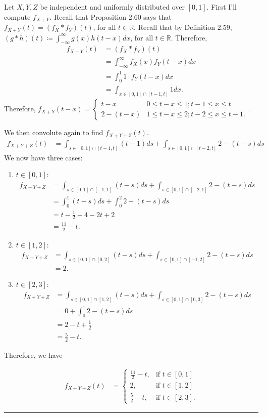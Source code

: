 \documentclass{article}
\theoremstyle{break}
\newenvironment{solution}{{\bf Solution:}}{\hfill\rule{2mm}{2mm}}
\newcommand{\R}{\mathbb{R}}
\begin{document}
\begin{solution}
Let $X,Y,Z$ be independent and uniformly distributed over $[0,1]$. First I'll compute $f_{X+Y}$. Recall that Proposition 2.60 says that $f_{X+Y}(t) = (f_X \ast f_Y)(t)$, for all $t \in \R$. Recall that by Definition 2.59, $(g \ast h)(t) \coloneqq \int_{-\infty}^\infty g(x) h(t-x) dx$, for all $t \in \R$. Therefore,
\begin{align*}
f_{X+Y}(t) &= (f_X \ast f_Y)(t) \\
	&= \int_{-\infty}^\infty f_X(x) f_Y(t-x) dx \\
	&= \int_0^1 1 \cdot f_Y(t-x) dx \\
	&= \int_{x \in [0,1]\cap[t-1,t]} 1 dx.
\end{align*}
Therefore, $f_{X+Y}(t-x) = \begin{cases}
t-x & 0 \leq t-x \leq 1; t-1 \leq x \leq t \\
2 - (t-x) & 1 \leq t-x \leq 2; t-2 \leq x \leq t-1.
\end{cases}$. 

We then convolute again to find $f_{X+Y+Z}(t)$. 
\begin{align*}
f_{X+Y+Z}(t) &= \int_{s \in [0,1] \cap [t-1,t]} (t-1)ds + \int_{s \in [0,1] \cap [t-2,t]} 2 - (t-s) ds
\end{align*}
We now have three cases:
\begin{enumerate}
\item $t \in [0,1]$:
\begin{align*}
f_{X+Y+Z} &= \int_{s \in [0,1] \cap [-1,1]} (t-s)ds + \int_{s \in [0,1] \cap [-2,1]} 2 - (t-s) ds \\
	&= \int_0^1 (t-s)ds + \int_0^2 2 - (t-s)ds \\
	&= t - \frac{1}{2} + 4 - 2t + 2 \\
	&= \frac{11}{2} - t.
\end{align*}
\item $ t\in [1,2]$:
\begin{align*}
f_{X+Y+Z} &= \int_{s \in [0,1] \cap [0,2] } (t-s) ds + \int_{s \in [0,1] \cap [-1,2]} 2 - (t-s) ds \\
	&= 2.
\end{align*}
\item $t \in [2,3]$:
\begin{align*}
f_{X+Y+Z} &= \int_{s \in [0,1] \cap [1,2]} (t-s) ds + \int_{s \in [0,1] \cap [0,3]} 2 - (t-s) ds \\
	&= 0 + \int_0^1 2 - (t-s) ds \\
	&= 2 - t + \frac{1}{2} \\
	&= \frac{5}{2} - t.
\end{align*}
\end{enumerate}
Therefore, we have 

\begin{align*}
f_{X+Y+Z}(t) &= \begin{cases}
\frac{11}{2} - t, & \text{if } t \in [0,1] \\
2, & \text{if } t \in [1,2] \\
\frac{5}{2} - t, & \text{if } t \in [2,3].
\end{cases}
\end{align*}


\end{solution}
\end{document}
